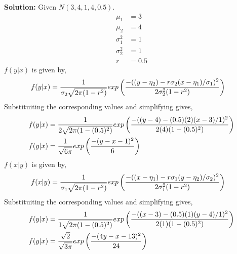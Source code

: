 \documentclass[journal,12pt,twocolumn]{IEEEtran}
\begin{document}
	\textbf{Solution:}
	Given $N(3,4,1,4,0.5)$.
	\begin{align}
	       \mu_1 &= 3 \\
	       \mu_2 &= 4 \\
	       \sigma_1^2 &= 1 \\ 
	       \sigma_2^2 &= 1 \\ 	       
	       r &= 0.5
	\end{align}
	$f(y|x)$ is given by,
	\begin{align}
	        f(y|x) &= \frac{1}{\sigma _2\sqrt{2\pi(1-r^2)}}exp\left(\frac{-((y-\eta_2)-r\sigma_2(x-\eta_1)/\sigma_1)^2}{2\sigma_2^2(1-r^2)}\right)
	\end{align}
	Substituiting the corresponding values and simplifying gives,
	\begin{align}
	        f(y|x) &= \frac{1}{2\sqrt{2\pi(1-(0.5)^2)}}exp\left(\frac{-((y-4)-(0.5)(2)(x-3)/1)^2}{2(4)(1-(0.5)^2)}\right) \\
	        f(y|x) &= \frac{1}{\sqrt{6\pi}}exp\left(\frac{-(y-x-1)^2}{6}\right)
	\end{align}
	$f(x|y)$ is given by,
	\begin{align}
	        f(x|y) &= \frac{1}{\sigma _1\sqrt{2\pi(1-r^2)}}exp\left(\frac{-((x-\eta_1)-r\sigma_1(y-\eta_2)/\sigma_2)^2}{2\sigma_1^2(1-r^2)}\right)
	\end{align}
	Substituiting the corresponding values and simplifying gives,
	\begin{align}
	        f(y|x) &= \frac{1}{1\sqrt{2\pi(1-(0.5)^2)}}exp\left(\frac{-((x-3)-(0.5)(1)(y-4)/1)^2}{2(1)(1-(0.5)^2)}\right) \\
	        f(y|x) &= \frac{\sqrt{2}}{\sqrt{3\pi}}exp\left(\frac{-(4y-x-13)^2}{24}\right)
	\end{align}
\end{document}
